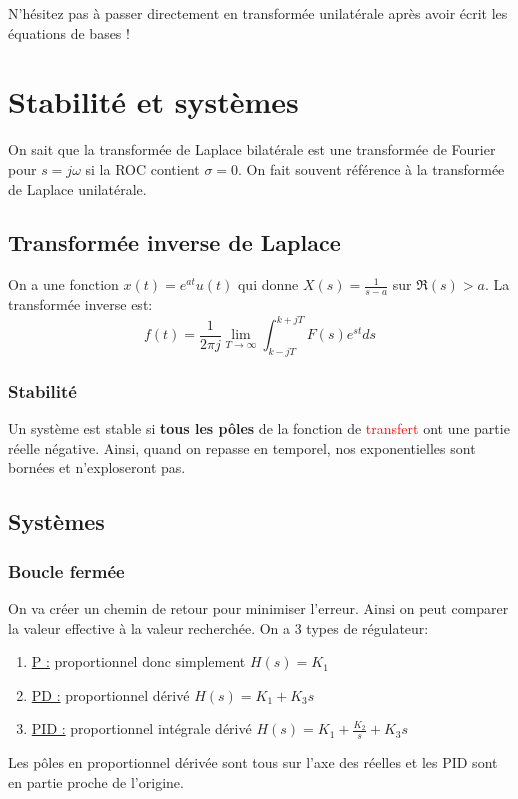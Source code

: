 \documentclass{report}
\begin{document}
N'hésitez pas à passer directement en transformée unilatérale après avoir écrit les équations de bases !

\chapter{Stabilité et systèmes}
On sait que la transformée de Laplace bilatérale est une transformée de Fourier pour $s = j \omega$ si la ROC contient $\sigma = 0$. On fait souvent référence à la transformée de Laplace unilatérale.

\section{Transformée inverse de Laplace}
On a une fonction $x(t) = e^{at} u(t)$ qui donne $X(s) = \frac{1}{s-a}$ sur $\mathfrak{R}(s) >a$. La transformée inverse est:
\begin{equation}
f(t) = \frac{1}{2 \pi j} \lim_{T\rightarrow \infty} \int_{k - j T}^{k + j T} F(s) e^{st} ds
\end{equation}

\subsection{Stabilité}
Un système est stable si \textbf{tous les pôles} de la fonction de \textcolor{red}{transfert} ont une partie réelle négative.
Ainsi, quand on repasse en temporel, nos exponentielles sont bornées et n'exploseront pas.

\section{Systèmes}
\subsection{Boucle fermée}
On va créer un chemin de retour pour minimiser l'erreur. Ainsi on peut comparer la valeur effective à la valeur recherchée. On a 3 types de régulateur:
\begin{enumerate}
\item \underline{P :} proportionnel donc simplement $H(s) = K_1$
\item \underline{PD :} proportionnel dérivé $H(s) = K_1 + K_3 s$
\item \underline{PID :} proportionnel intégrale dérivé $H(s) = K_1 + \frac{K_2}{s} + K_3 s$
\end{enumerate}
Les pôles en proportionnel dérivée sont tous sur l'axe des réelles et les PID sont en partie proche de l'origine.
\end{document}
